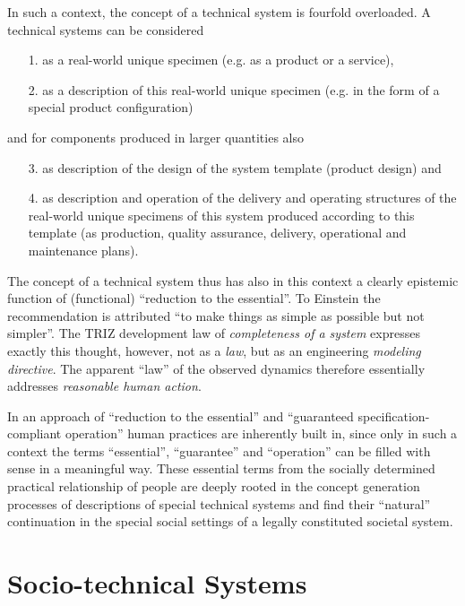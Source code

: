 \documentclass[11pt,a4paper]{article}
\begin{document}
In such a context, the concept of a technical system is fourfold overloaded.
A technical systems can be considered
\begin{itemize}
\item [1.] as a real-world unique specimen (e.g. as a product or a service),
\item [2.] as a description of this real-world unique specimen (e.g. in the
  form of a special product configuration)
\end{itemize}
and for components produced in larger quantities also
\newpage
\begin{itemize}
\item [3.] as description of the design of the system template (product
  design) and
\item [4.] as description and operation of the delivery and operating
  structures of the real-world unique specimens of this system produced
  according to this template (as production, quality assurance, delivery,
  operational and maintenance plans).
\end{itemize}
The concept of a technical system thus has also in this context a clearly
epistemic function of (functional) ``reduction to the essential''. To Einstein
the recommendation is attributed ``to make things as simple as possible but
not simpler''. The TRIZ development law of \emph{completeness of a system}
expresses exactly this thought, however, not as a \emph{law}, but as an
engineering \emph{modeling directive}. The apparent ``law'' of the observed
dynamics therefore essentially addresses \emph{reasonable human action}.

In an approach of ``reduction to the essential'' and ``guaranteed
specification-compliant operation'' human practices are inherently built in,
since only in such a context the terms ``essential'', ``guarantee'' and
``operation'' can be filled with sense in a meaningful way. These essential
terms from the socially determined practical relationship of people are deeply
rooted in the concept generation processes of descriptions of special
technical systems and find their ``natural'' continuation in the special
social settings of a legally constituted societal system.

\section{Socio-technical Systems}
\end{document}
